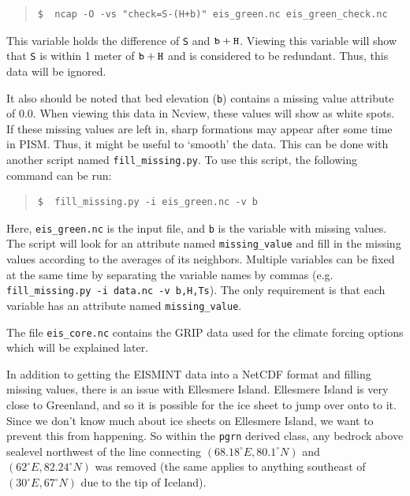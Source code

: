 \documentclass[11pt,final]{amsart}
\begin{document}
\small\begin{quote}\begin{verbatim}
$  ncap -O -vs "check=S-(H+b)" eis_green.nc eis_green_check.nc
\end{verbatim}
\end{quote}\normalsize

\noindent This variable holds the difference of \verb|S| and $\verb|b|+\verb|H|$.  Viewing this variable will show that \verb|S| is within 1 meter of $\verb|b|+\verb|H|$ and is considered to be redundant.  Thus, this data will be ignored.

It also should be noted that bed elevation (\verb|b|) contains a missing value attribute of $0.0$. When viewing this data in Ncview, these values will show as white spots. If these missing values are left in, sharp formations may appear after some time in PISM. Thus, it might be useful to `smooth' the data. This can be done with another script named \verb|fill_missing.py|. To use this script, the following command can be run:

\small\begin{quote}\begin{verbatim}
$  fill_missing.py -i eis_green.nc -v b
\end{verbatim}
\end{quote}\normalsize

\noindent Here, \verb|eis_green.nc| is the input file, and \verb|b| is the variable with missing values. The script will look for an attribute named \verb|missing_value| and fill in the missing values according to the averages of its neighbors. Multiple variables can be fixed at the same time by separating the variable names by commas (e.g. \verb|fill_missing.py -i data.nc -v b,H,Ts|). The only requirement is that each variable has an attribute named \verb|missing_value|.

The file \verb|eis_core.nc| contains the GRIP data used for the climate forcing options which will be explained later.

In addition to getting the EISMINT data into a NetCDF format and filling missing values, there is an issue with Ellesmere Island. Ellesmere Island is very close to Greenland, and so it is possible for the ice sheet to jump over onto to it. Since we don't know much about ice sheets on Ellesmere Island, we want to prevent this from happening. So within the \verb|pgrn| derived class, any bedrock above sealevel northwest of the line connecting $(68.18^\circ E, 80.1^\circ N)$ and $(62^\circ E, 82.24^\circ N)$ was removed (the same applies to anything southeast of $(30^\circ E, 67^\circ N)$ due to the tip of Iceland).
\end{document}
